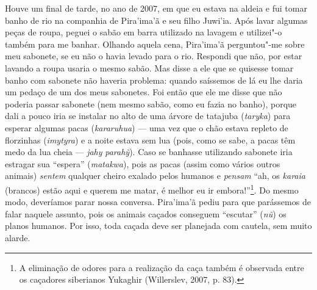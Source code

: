 Houve um final de tarde, no ano de 2007, em que eu estava na aldeia e
fui tomar banho de rio na companhia de Pira'ima'ã e seu filho Juwi'ia.
Após lavar algumas peças de roupa, peguei o sabão em barra utilizado na
lavagem e utilizei"-o também para me banhar. Olhando aquela cena,
Pira'ima'ã perguntou"-me sobre meu sabonete, se eu não o havia levado
para o rio. Respondi que não, por estar lavando a roupa usaria o mesmo
sabão. Mas disse a ele que se quisesse tomar banho com sabonete não
haveria problema: quando saíssemos de lá eu lhe daria um pedaço de um
dos meus sabonetes. Foi então que ele me disse que não poderia passar
sabonete (nem mesmo sabão, como eu fazia no banho), porque dali a pouco
iria se instalar no alto de uma árvore de tatajuba (\emph{taryka}) para
esperar algumas pacas (\emph{kararuhua}) --- uma vez que o chão estava
repleto de florzinhas (\emph{imytyra}) e a noite estava sem lua (pois,
como se sabe, a pacas têm medo da lua cheia --- \emph{jahy}
\emph{parahỹ}). Caso se banhasse utilizando sabonete iria estragar sua
``espera'' (\emph{matakwa}), pois as pacas (assim como vários outros
animais) \emph{sentem} qualquer cheiro exalado pelos humanos e
\emph{pensam} ``ah, os \emph{karaia} (brancos) estão aqui e querem me
matar, é melhor eu ir embora!''\footnote{A eliminação de odores para a
  realização da caça também é observada entre os caçadores siberianos
  Yukaghir (Willerslev, 2007, p. 83).}. Do mesmo modo, deveríamos parar
nossa conversa. Pira'ima'ã pediu para que parássemos de falar naquele
assunto, pois os animais caçados conseguem ``escutar'' (\emph{nũ}) os
planos humanos. Por isso, toda caçada deve ser planejada com cautela,
sem muito alarde.


